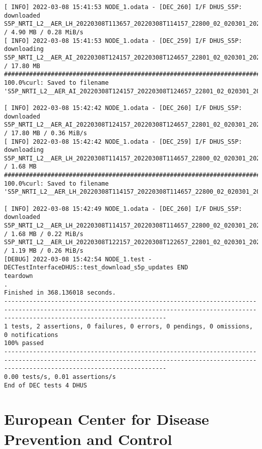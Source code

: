 \documentclass[dec_sum_main.tex]{subfiles}
\begin{document}
\begin{Verbatim}[fontsize=\tiny]
[ INFO] 2022-03-08 15:41:53 NODE_1.odata - [DEC_260] I/F DHUS_S5P: downloaded S5P_NRTI_L2__AER_LH_20220308T113657_20220308T114157_22800_02_020301_20220308T132756 / 4.90 MB / 0.28 MiB/s
[ INFO] 2022-03-08 15:41:53 NODE_1.odata - [DEC_259] I/F DHUS_S5P: downloading S5P_NRTI_L2__AER_AI_20220308T124157_20220308T124657_22801_02_020301_20220308T133432 / 17.80 MB
################################################################################################################################################################################## 100.0%curl: Saved to filename 'S5P_NRTI_L2__AER_AI_20220308T124157_20220308T124657_22801_02_020301_20220308T133432.nc'

[ INFO] 2022-03-08 15:42:42 NODE_1.odata - [DEC_260] I/F DHUS_S5P: downloaded S5P_NRTI_L2__AER_AI_20220308T124157_20220308T124657_22801_02_020301_20220308T133432 / 17.80 MB / 0.36 MiB/s
[ INFO] 2022-03-08 15:42:42 NODE_1.odata - [DEC_259] I/F DHUS_S5P: downloading S5P_NRTI_L2__AER_LH_20220308T114157_20220308T114657_22800_02_020301_20220308T132624 / 1.68 MB
################################################################################################################################################################################## 100.0%curl: Saved to filename 'S5P_NRTI_L2__AER_LH_20220308T114157_20220308T114657_22800_02_020301_20220308T132624.nc'

[ INFO] 2022-03-08 15:42:49 NODE_1.odata - [DEC_260] I/F DHUS_S5P: downloaded S5P_NRTI_L2__AER_LH_20220308T114157_20220308T114657_22800_02_020301_20220308T132624 / 1.68 MB / 0.22 MiB/s
S5P_NRTI_L2__AER_LH_20220308T122157_20220308T122657_22801_02_020301_20220308T132926 / 1.19 MB / 0.26 MiB/s
[DEBUG] 2022-03-08 15:42:54 NODE_1.test - DECTestInterfaceDHUS::test_download_s5p_updates END
teardown
.
Finished in 368.136018 seconds.
-----------------------------------------------------------------------------------------------------------------------------------------------------------------------------------------
1 tests, 2 assertions, 0 failures, 0 errors, 0 pendings, 0 omissions, 0 notifications
100% passed
-----------------------------------------------------------------------------------------------------------------------------------------------------------------------------------------
0.00 tests/s, 0.01 assertions/s
End of DEC tests 4 DHUS
\end{Verbatim}

\pagebreak


\section{European Center for Disease Prevention and Control }
\end{document}
